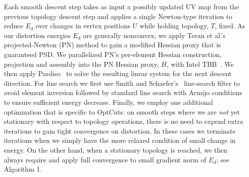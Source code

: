 Each smooth descent step takes as input a possibly updated UV map from the previous topology descent step and applies a single Newton-type iteration to reduce $E_d$ over changes in vertex positions $U$ while holding topology, $T$, fixed.
%
As our distortion energies $E_{d}$ are generally nonconvex, we apply Teran et al.'s\  projected-Newton (PN) method to gain a modified Hessian proxy that is guaranteed PSD. We parallelized PN's per-element Hessian construction,   projection and assembly into the PN Hessian proxy, $H$, with Intel TBB~\cite{Reinders2007Intel}.  We then apply Pardiso~\cite{pardiso-6.0a, pardiso-6.0b} to solve the resulting linear system for the next descent direction. For line search we first use Smith and Schaefer's~ line-search filter to avoid element inversion followed by standard line search with Armijo conditions~ to ensure sufficient energy decrease. Finally, we employ one additional optimization that is specific to OptCuts: on smooth steps where we are \emph{not} yet stationary with respect to topology operations, there is no need to expend extra iterations to gain tight convergence on distortion. In these cases we terminate iterations when we simply have the more relaxed condition of small change in energy. On the other hand, when a stationary topology is reached, we then always require and apply full convergence to small gradient norm of $E_d$; see Algorithm 1.


